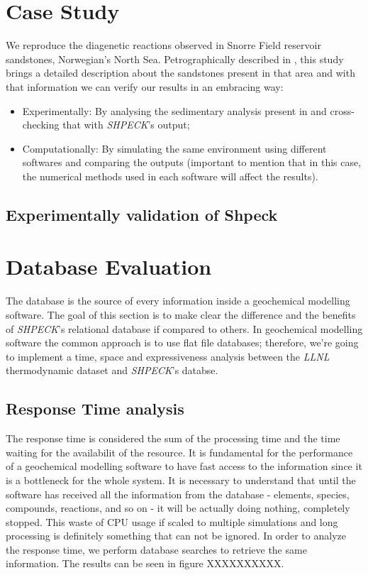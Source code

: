 \documentclass[ppgc,mestrado,English]{iiufrgs}
\begin{document}
\section{Case Study}
We reproduce the diagenetic reactions observed in Snorre Field reservoir sandstones, Norwegian's North Sea. Petrographically described in \cite{Morad:90}, this study brings a detailed description about the sandstones present in that area and with that information we can verify our results in an embracing way:
\begin{itemize}
\item Experimentally: By analysing the sedimentary analysis present in \cite{Morad:90} and cross-checking that with \emph{SHPECK}'s output;
\item Computationally: By simulating the same environment using different softwares and comparing the outputs (important to mention that in this case, the numerical methods used in each software will affect the results). 
\end{itemize}

\subsection{Experimentally validation of Shpeck}


\section{Database Evaluation}
The database is the source of every information inside a geochemical modelling software. The goal of this section is to make clear the difference and the benefits of \emph{SHPECK}'s relational database if compared to others. In geochemical modelling software the common approach is to use flat file databases; therefore, we're going to implement a time, space and expressiveness analysis between the \emph{LLNL} thermodynamic dataset and \emph{SHPECK}'s databse. 


\subsection{Response Time analysis}
The response time is considered the sum of the processing time and the time waiting for the availabilit of the resource. It is fundamental for the performance of a geochemical modelling software to have fast access to the information since it is a bottleneck for the whole system. 
It is necessary to understand that until the software has received all the information from the database - elements, species, compounds, reactions, and so on - it will be actually doing nothing, completely stopped. This waste of CPU usage if scaled to multiple simulations and long processing is definitely something that can not be ignored. 
In order to analyze the response time, we perform database searches to retrieve the same information. The results can be seen in figure XXXXXXXXXX.
\end{document}
